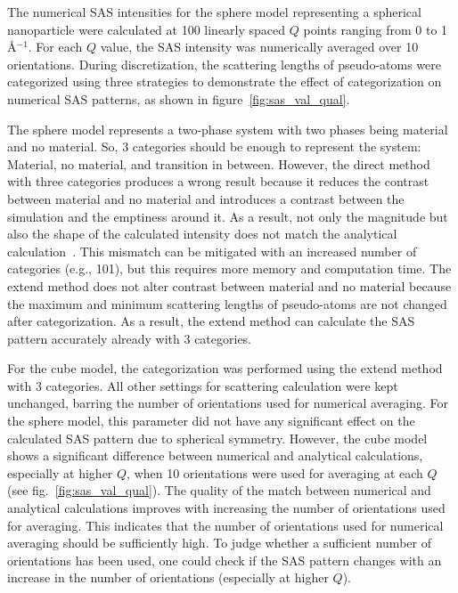 \documentclass[preprint, 5p, times, twocolumn]{elsarticle}
\begin{document}
%
The numerical SAS intensities for the sphere model representing a spherical nanoparticle were calculated at 100 linearly spaced $Q$ points ranging from 0 to 1\,\AA{$^{-1}$}. For each $Q$ value, the SAS intensity was numerically averaged over 10 orientations. During discretization, the scattering lengths of pseudo-atoms were categorized using three strategies to demonstrate the effect of categorization on numerical SAS patterns, as shown in figure~\ref{fig:sas_val_qual}. 

The sphere model represents a two-phase system with two phases being material and no material. So, 3 categories should be enough to represent the system: Material, no material, and transition in between. However, the direct method with three categories produces a wrong result because it reduces the contrast between material and no material and introduces a contrast between the simulation and the emptiness around it. As a result, not only the magnitude but also the shape of the calculated intensity does not match the analytical calculation~\cite{majumdar2024computation}. This mismatch can be mitigated with an increased number of categories (e.g., 101), but this requires more memory and computation time. The extend method does not alter contrast between material and no material because the maximum and minimum scattering lengths of pseudo-atoms are not changed after categorization. As a result, the extend method can calculate the SAS pattern accurately already with 3 categories.

For the cube model, the categorization was performed using the extend method with 3 categories. All other settings for scattering calculation were kept unchanged, barring the number of orientations used for numerical averaging. For the sphere model, this parameter did not have any significant effect on the calculated SAS pattern due to spherical symmetry. However, the cube model shows a significant difference between numerical and analytical calculations, especially at higher $Q$, when 10 orientations were used for averaging at each $Q$ (see fig.~\ref{fig:sas_val_qual}). The quality of the match between numerical and analytical calculations improves with increasing the number of orientations used for averaging. This indicates that the number of orientations used for numerical averaging should be sufficiently high. To judge whether a sufficient number of orientations has been used, one could check if the SAS pattern changes with an increase in the number of orientations (especially at higher $Q$).
\end{document}
